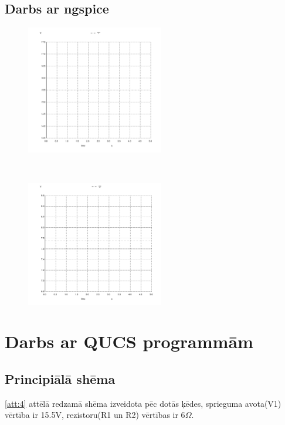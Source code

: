 \documentclass{report}
\begin{document}
\subsection{Darbs ar ngspice}

\begin{figure}[b!]
\centering
\begin{minipage}{.5\textwidth}
\centering
\includegraphics[width=6cm]{011.png}
\label{att:2}
\end{minipage}%
\\
\begin{minipage}{.5\textwidth}
\centering
\includegraphics[width=6cm]{012.png}
\label{att:3}
\end{minipage}
\end{figure}

\newpage
\section{Darbs ar QUCS programmām}
\subsection{Principiālā shēma}
\ref{att:4} attēlā redzamā shēma izveidota pēc dotās ķēdes,  sprieguma avota(V1) vērtība ir 15.5V, rezistoru(R1 un R2) vērtības ir 6$\Omega$.
\end{document}
